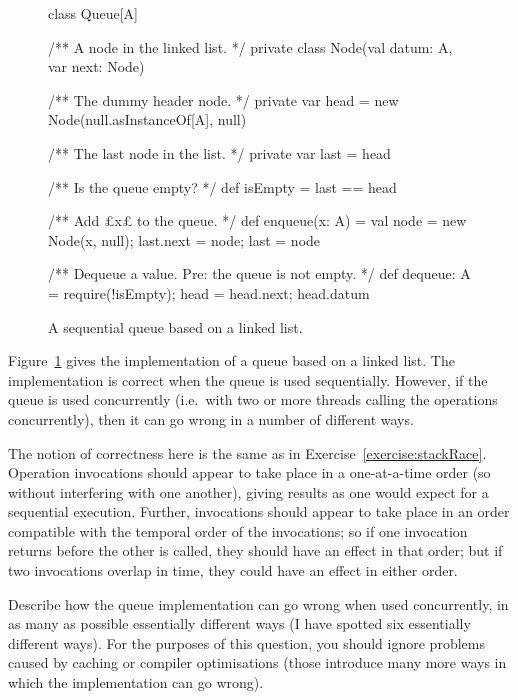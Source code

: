 \begin{question}
\begin{figure}
\begin{scala}
class Queue[A]{
  /** A node in the linked list. */
  private class Node(val datum: A, var next: Node)

  /** The dummy header node. */
  private var head = new Node(null.asInstanceOf[A], null)

  /** The last node in the list. */
  private var last = head

  /** Is the queue empty? */
  def isEmpty = last == head

  /** Add £x£ to the queue. */
  def enqueue(x: A) = {
    val node = new Node(x, null); last.next = node; last = node
  }

  /** Dequeue a value.  Pre: the queue is not empty. */
  def dequeue: A = {
    require(!isEmpty); head = head.next; head.datum
  }
}
\end{scala}
\caption{A sequential queue based on a linked list.}
\label{fig:queue}
\end{figure}

Figure~\ref{fig:queue} gives the implementation of a queue based on a linked
list.  The implementation is correct when the queue is used sequentially.
However, if the queue is used concurrently (i.e.~with two or more threads
calling the operations concurrently), then it can go wrong in a number of
different ways.  

The notion of correctness here is the same as in
Exercise~\ref{exercise:stackRace}.  Operation invocations should appear to
take place in a one-at-a-time order (so without interfering with one another),
giving results as one would expect for a sequential execution.  Further,
invocations should appear to take place in an order compatible with the
temporal order of the invocations; so if one invocation returns before the
other is called, they should have an effect in that order; but if two
invocations overlap in time, they could have an effect in either order.


%
Describe how the queue implementation can go wrong when used concurrently, in
as many as possible essentially different ways (I have spotted six essentially
different ways).
%
For the purposes of this question, you should ignore problems caused by
caching or compiler optimisations (those introduce many more ways in which the
implementation can go wrong).
\end{question}

